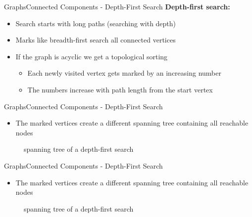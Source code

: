 
\begin{frame}{Graphs}{Connected Components - Depth-First Search}
  \textbf{Depth-first search:}
  \begin{itemize}
    \item<2->
      Search starts with {\color{MainA}long paths} (searching with depth)
    \item<3->
      Marks like {\color{MainA}breadth-first search} all connected
      vertices
    \item<4->
      If the graph is acyclic we get a {\color{MainA}topological sorting}
      \begin{itemize}
        \item<5->
          Each newly visited vertex gets marked by an increasing number
        \item<6->
          The numbers increase with path length from the start vertex
      \end{itemize}
  \end{itemize}
\end{frame}


\begin{frame}{Graphs}{Connected Components - Depth-First Search}
  \begin{itemize}
    \item
      The marked vertices create a different spanning tree containing all
      reachable nodes
  \end{itemize}
  \begin{figure}
    \begin{adjustbox}{width=0.95\linewidth}
      
    \end{adjustbox}
    \caption{spanning tree of a depth-first search}
  \end{figure}
\end{frame}


\begin{frame}{Graphs}{Connected Components - Depth-First Search}
  \begin{itemize}
    \item
      The marked vertices create a different spanning tree containing all
      reachable nodes
  \end{itemize}
  \begin{figure}
    \begin{adjustbox}{width=0.95\linewidth}
      
    \end{adjustbox}
    \caption{spanning tree of a depth-first search}
  \end{figure}
\end{frame}

